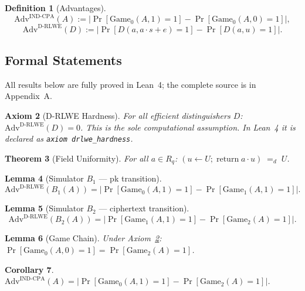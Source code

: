 \documentclass[11pt,a4paper]{article}
\newtheorem{theorem}{Theorem}[section]
\newtheorem{lemma}[theorem]{Lemma}
\newtheorem{corollary}[theorem]{Corollary}
\newtheorem{definition}[theorem]{Definition}
\newtheorem{axiom}[theorem]{Axiom}
\theoremstyle{remark}
\begin{document}
\begin{definition}[Advantages]\label{def:adv}
\[
\mathrm{Adv}^{\mathrm{IND\text{-}CPA}}(A)
  :=\bigl|\Pr[\mathrm{Game}_{0}(A,1)=1]-\Pr[\mathrm{Game}_{0}(A,0)=1]\bigr|,
\]
\[
\mathrm{Adv}^{\mathrm{D\text{-}RLWE}}(D)
  :=\bigl|\Pr[D(a,a\cdot s+e)=1]-\Pr[D(a,u)=1]\bigr|.
\]
\end{definition}

\subsection{Formal Statements}

All results below are fully proved in Lean~4; the complete source is in
Appendix~A.

\begin{axiom}[D-RLWE Hardness]\label{ax:drlwe}
For all efficient distinguishers $D$:
$\mathrm{Adv}^{\mathrm{D\text{-}RLWE}}(D)=0$.
This is the sole computational assumption.
In Lean~4 it is declared as \texttt{axiom drlwe\_hardness}.
\end{axiom}

\begin{theorem}[Field Uniformity]\label{thm:uniform}
For all $a\in R_{q}$:
$(u\leftarrow U;\;\mathrm{return}\;a\cdot u)\;=_{d}\;U$.
\end{theorem}

\begin{lemma}[Simulator $B_{1}$ --- pk transition]\label{lem:B1}
\[
\mathrm{Adv}^{\mathrm{D\text{-}RLWE}}(B_{1}(A))
  =\bigl|\Pr[\mathrm{Game}_{0}(A,1)=1]-\Pr[\mathrm{Game}_{1}(A,1)=1]\bigr|.
\]
\end{lemma}

\begin{lemma}[Simulator $B_{2}$ --- ciphertext transition]\label{lem:B2}
\[
\mathrm{Adv}^{\mathrm{D\text{-}RLWE}}(B_{2}(A))
  =\bigl|\Pr[\mathrm{Game}_{1}(A,1)=1]-\Pr[\mathrm{Game}_{2}(A)=1]\bigr|.
\]
\end{lemma}

\begin{lemma}[Game Chain]\label{lem:chain}
Under Axiom~\ref{ax:drlwe}:
$\Pr[\mathrm{Game}_{0}(A,0)=1]=\Pr[\mathrm{Game}_{2}(A)=1]$.
\end{lemma}

\begin{corollary}\label{cor:adv-eq}
$\mathrm{Adv}^{\mathrm{IND\text{-}CPA}}(A)
  =|\Pr[\mathrm{Game}_{0}(A,1)=1]-\Pr[\mathrm{Game}_{2}(A)=1]|$.
\end{corollary}
\end{document}
